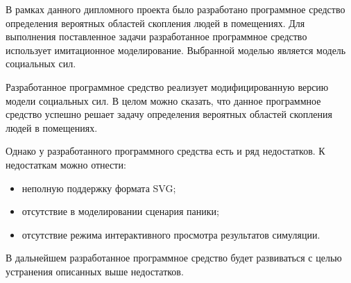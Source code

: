
В рамках данного дипломного проекта было разработано программное средство определения вероятных областей скопления людей в помещениях.
Для выполнения поставленное задачи разработанное программное средство использует имитационное моделирование.
Выбранной моделью является модель социальных сил.

Разработанное программное средство реализует модифицированную версию модели социальных сил.
В целом можно сказать, что данное программное средство успешно решает задачу определения вероятных областей скопления людей в помещениях.

Однако у разработанного программного средства есть и ряд недостатков.
К недостаткам можно отнести:
\begin{itemize}
  \item неполную поддержку формата SVG;
  \item отсутствие в моделировании сценария паники;
  \item отсутствие режима интерактивного просмотра результатов симуляции.
\end{itemize}

В дальнейшем разработанное программное средство будет развиваться с целью устранения описанных выше недостатков.
